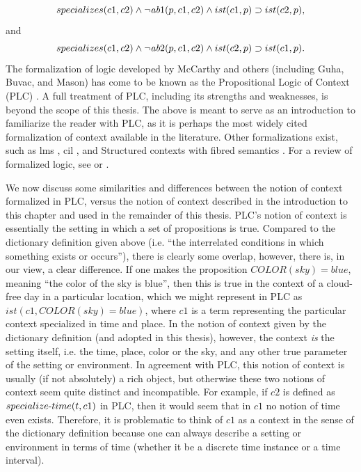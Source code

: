 \begin{equation}
specializes(c1,c2) \land \lnot \hbox{\it ab}1(p,c1,c2) \land ist(c1,p)
\supset ist(c2,p),\label{spec1}
\end{equation}
%
and
%
\begin{equation}
specializes(c1,c2) \land \lnot \hbox{\it ab}2(p,c1,c2) \land ist(c2,p)
\supset ist(c1,p). 
\end{equation}
%
The formalization of logic developed by McCarthy and others (including Guha, Buvac, and Mason) has come to be known as the Propositional Logic of Context (PLC) \cite{buvac1993propositional}. A full treatment of PLC, including its strengths and weaknesses, is beyond the scope of this thesis. The above is meant to serve as an introduction to familiarize the reader with PLC, as it is perhaps the most widely cited formalization of context available in the literature. Other formalizations exist, such as \gls{lms} \cite{ghidini2001local}, \gls{cil} \cite{thomason2006contextual}, and Structured contexts with fibred semantics \cite{gabbay2000structured}. For a review of formalized logic, see \cite{bouquet2003theories} or \cite{boquet2001}.

We now discuss some similarities and differences between the notion of context formalized in PLC, versus the notion of context described in the introduction to this chapter and used in the remainder of this thesis. PLC's notion of context is essentially the setting in which a set of propositions is true. Compared to the dictionary definition given above (i.e. ``the interrelated conditions in which something exists or occurs''), there is clearly some overlap, however, there is, in our view, a clear difference. If one makes the proposition $COLOR(sky) = blue$, meaning ``the color of the sky is blue'', then this is true in the context of a cloud-free day in a particular location, which we might represent in PLC as $ist(c1, COLOR(sky) = blue)$, where $c1$ is a term representing the particular context specialized in time and place. In the notion of context given by the dictionary definition (and adopted in this thesis), however, the context \emph{is} the setting itself, i.e. the time, place, color or the sky, and any other true parameter of the setting or environment. In agreement with PLC, this notion of context is usually (if not absolutely) a rich object, but otherwise these two notions of context seem quite distinct and incompatible. For example, if $c2$ is defined as $specialize\textnormal{-}time(t, c1)$ in PLC, then it would seem that in $c1$ no notion of time even exists. Therefore, it is problematic to think of $c1$ as a context in the sense of the dictionary definition because one can always describe a setting or environment in terms of time (whether it be a discrete time instance or a time interval).

